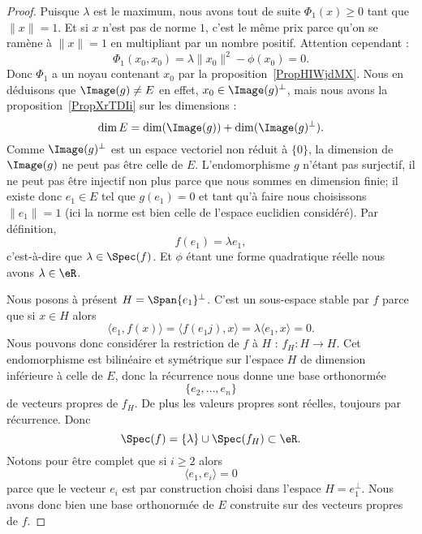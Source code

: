 \begin{proof}
    Puisque \( \lambda\) est le maximum, nous avons tout de suite \( \Phi_1(x)\geq 0\) tant que \( \| x \|=1\). Et si \( x\) n'est pas de norme \( 1\), c'est le même prix parce qu'on se ramène à \( \| x \|=1\) en multipliant par un nombre positif. Attention cependant :
    \begin{equation}
        \Phi_1(x_0,x_0)=\lambda\| x_0 \|^2-\phi(x_0)=0.
    \end{equation}
    Donc \( \Phi_1\) a un noyau contenant \( x_0\) par la proposition~\ref{PropHIWjdMX}. Nous en déduisons que \( \Image(g)\neq E\) en effet, \( x_0\in\Image(g)^{\perp}\), mais nous avons la proposition~\ref{PropXrTDIi} sur les dimensions :
    \begin{equation}
        \dim E=\dim(\Image(g))+\dim( \Image(g)^{\perp}).
    \end{equation}
    Comme \( \Image(g)^{\perp}\) est un espace vectoriel non réduit à \( \{ 0 \}\), la dimension de \( \Image(g)\) ne peut pas être celle de \( E\). L'endomorphisme \( g\) n'étant pas surjectif, il ne peut pas être injectif non plus parce que nous sommes en dimension finie; il existe donc \( e_1\in E\) tel que \( g(e_1)=0\) et tant qu'à faire nous choisissons \( \| e_1 \|=1\) (ici la norme est bien celle de l'espace euclidien considéré). Par définition,
    \begin{equation}
        f(e_1)=\lambda e_1,
    \end{equation}
    c'est-à-dire que \( \lambda\in\Spec(f)\). Et \( \phi\) étant une forme quadratique réelle nous avons \( \lambda\in \eR\).

    Nous posons à présent \( H=\Span\{ e_1 \}^{\perp}\). C'est un sous-espace stable par \( f\) parce que si \( x\in H\) alors
    \begin{equation}
        \langle e_1, f(x)\rangle =\langle f(e_1j),x\rangle =\lambda\langle e_1, x\rangle =0.
    \end{equation}
    Nous pouvons donc considérer la restriction de \( f\) à \( H\) : \( f_H\colon H\to H\). Cet endomorphisme est bilinéaire et symétrique sur l'espace \( H\) de dimension inférieure à celle de \( E\), donc la récurrence nous donne une base orthonormée
    \begin{equation}
        \{ e_2,\ldots, e_n \}
    \end{equation}
    de vecteurs propres de \( f_H\). De plus les valeurs propres sont réelles, toujours par récurrence. Donc
    \begin{equation}
        \Spec(f)=\{ \lambda \}\cup\Spec(f_H)\subset \eR.
    \end{equation}
    Notons pour être complet que si \( i\geq 2\) alors
    \begin{equation}
        \langle e_1, e_i\rangle =0
    \end{equation}
    parce que le vecteur \( e_i\) est par construction choisi dans l'espace \( H=e_1^{\perp}\). Nous avons donc bien une base orthonormée de \( E\) construite sur des vecteurs propres de \( f\).
\end{proof}

